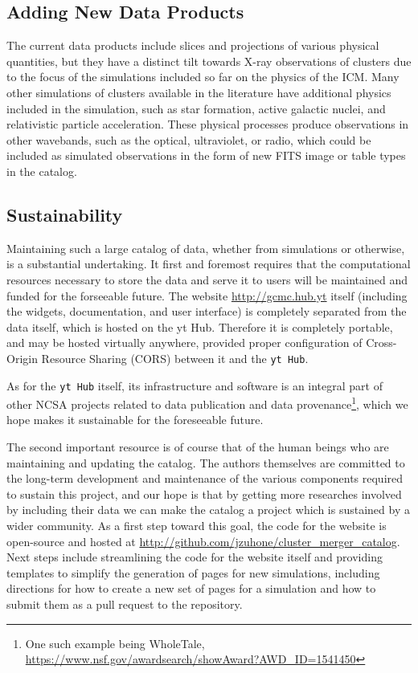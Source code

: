 \documentclass{emulateapj}
\newcommand{\code}[1]{\texttt{#1}}
\begin{document}
\subsection{Adding New Data Products}\label{sec:new_data}

The current data products include slices and projections of various physical quantities, but they have a distinct tilt towards X-ray observations of clusters due to the focus of the simulations included so far on the physics of the ICM. Many other simulations of clusters available in the literature have additional physics included in the simulation, such as star formation, active galactic nuclei, and relativistic particle acceleration. These physical processes produce observations in other wavebands, such as the optical, ultraviolet, or radio, which could be included as simulated observations in the form of new FITS image or table types in the catalog.

\subsection{Sustainability}\label{sec:sustainability}

Maintaining such a large catalog of data, whether from simulations or otherwise, is a substantial undertaking. It first and foremost requires that the computational resources necessary to store the data and serve it to users will be maintained and funded for the forseeable future. The website \url{http://gcmc.hub.yt} itself (including the widgets, documentation, and user interface) is completely separated from the data itself, which is hosted on the yt Hub. Therefore it is completely portable, and may be hosted virtually anywhere, provided proper configuration of Cross-Origin Resource Sharing (CORS) between it and the \code{yt Hub}.

As for the \code{yt Hub} itself, its infrastructure and software is an integral part of other NCSA projects related to data publication and data provenance\footnote{One such example being WholeTale, \url{https://www.nsf.gov/awardsearch/showAward?AWD_ID=1541450}}, which we hope makes it sustainable for the foreseeable future.

The second important resource is of course that of the human beings who are maintaining and updating the catalog. The authors themselves are committed to the long-term development and maintenance of the various components required to sustain this project, and our hope is that by getting more researches involved by including their data we can make the catalog a project which is sustained by a wider community. As a first step toward this goal, the code for the website is open-source and hosted at \url{http://github.com/jzuhone/cluster_merger_catalog}. Next steps include streamlining the code for the website itself and providing templates to simplify the generation of pages for new simulations, including directions for how to create a new set of pages for a simulation and how to submit them as a pull request to the repository.
\end{document}
